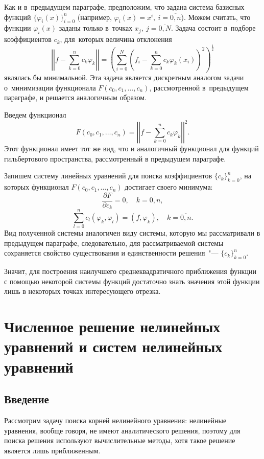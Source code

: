 \documentclass[11pt,a4paper,twoside]{report}
\numberwithin{equation}{section}
\theoremstyle{definition}
\theoremstyle{plain}
\begin{document}
Как и в~предыдущем параграфе, предположим, что задана система базисных функций
$\{\varphi_i(x)\}_{i=0}^n$ (например, $\varphi_i(x) = x^i,~i=\overline{0,n}$).
Можем считать, что функции $\varphi_i(x)$ заданы только в~точках
$x_j,~j=\overline{0,N}$. Задача состоит в~подборе коэффициентов $c_k$,
для~которых величина отклонения
%
$$
    \left|\left|f - \sum\limits_{k=0}^n c_k \varphi_k\right|\right| = \left(\sum\limits_{i=0}^N
    \left(f_i - \sum\limits_{k=0}^n c_k \varphi_k(x_i)\right)^2\right)^\frac{1}{2}
$$
%
являлась бы минимальной. Эта задача является дискретным аналогом задачи
о~минимизации функционала $F(c_0, c_1, \ldots, c_n)$, рассмотренной в~предыдущем
параграфе, и решается аналогичным
образом.

Введем функционал
%
$$
    F(c_0, c_1, \ldots, c_n) = \left|\left|f - \sum\limits_{k=0}^{n} c_k \varphi_k
    \right|\right|^2.
$$
%
Этот функционал имеет тот же вид, что и аналогичный
функционал для функций гильбертового пространства, рассмотренный в предыдущем параграфе.

Запишем систему линейных уравнений для поиска коэффициентов $\{c_k\}_{k=0}^{n}$, на
которых функционал $F(c_0, c_1, \ldots, c_n)$ достигает своего минимума:
%
$$
    \frac{\partial F}{\partial c_k} = 0, \quad k = \overline{0,n},
$$
%
%
$$
    \sum\limits_{l=0}^{n} c_l (\varphi_k, \varphi_l) = (f, \varphi_k),
    \quad k = \overline{0,n}.
$$
%
Вид полученной системы аналогичен виду системы, которую мы рассматривали в предыдущем
параграфе, следовательно, для рассматриваемой системы сохраняется свойство существования и
единственности решения~"--- $\{c_k\}_{k=0}^{n}$.

Значит, для построения наилучшего среднеквадратичного приближения функции
с помощью некоторой системы функций достаточно знать значения этой функции
лишь в некоторых точках интересующего отрезка.
%
\chapter{Численное решение нелинейных уравнений и систем нелинейных уравнений}
%
\label{chapter_nonlinear_eqs}
%
\section{Введение}
%

Рассмотрим задачу поиска корней нелинейного уравнения: нелинейные уравнения,
вообще говоря, не имеют аналитического решения, поэтому для поиска решения
используют вычислительные методы, хотя такое решение является лишь приближенным.
\end{document}
